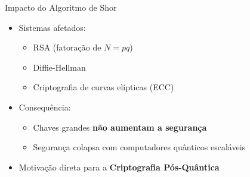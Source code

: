 \documentclass[aspectratio=169]{beamer}
\begin{document}
	\begin{frame}{Impacto do Algoritmo de Shor}
		
		\begin{itemize}
			
			\item Sistemas afetados:
			
			\begin{itemize}
				
				\item RSA (fatoração de \(N = pq\))
				
				\item Diffie-Hellman
				
				\item Criptografia de curvas elípticas (ECC)
				
			\end{itemize}
			
			\item Consequência:
			
			\begin{itemize}
				
				\item Chaves grandes \textbf{não aumentam a segurança}
				
				\item Segurança colapsa com computadores quânticos escaláveis
				
			\end{itemize}
			
			\item Motivação direta para a \textbf{Criptografia Pós-Quântica}
			
		\end{itemize}
		
	\end{frame} 
	
\end{document}
